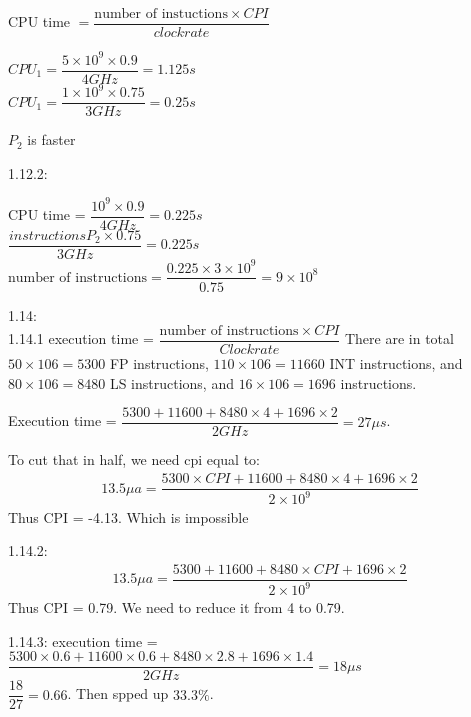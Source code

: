 \documentclass[12pt]{article}
\begin{document}
	CPU time $= \dfrac{\text{number of instuctions} \times CPI}{clock rate}$
	
	$CPU_1 = \dfrac{5 \times 10^9 \times 0.9}{4 GHz}= 1.125s$\\
	$CPU_1 = \dfrac{1 \times 10^9 \times 0.75}{3 GHz}= 0.25s$
	
	$P_2$ is faster
	
	1.12.2:
	
	CPU time = $\dfrac{10^9 \times 0.9}{4GHz} = 0.225s$\\
	$\dfrac{instructionsP_2 \times 0.75}{3 GHz} = 0.225s$\\
	$\text{number of instructions}=\dfrac{0.225 \times 3 \times 10^9}{0.75}=9 \times 10^8$
	
	1.14:\\
	1.14.1
	execution time  = $\dfrac{\text{number of instructions} \times CPI}{Clock rate}$
	There are in total $50 \times 106 = 5300$ FP instructions, $110 \times 106 = 11660$ INT instructions, and $80 \times 106 = 8480$ LS instructions, and $16 \times 106 = 1696$ instructions.
	
	Execution time = $\dfrac{5300 + 11600 + 8480 \times 4 + 1696 \times 2}{2GHz} = 27 \mu s$.
	
	To cut that in half, we need cpi equal to:
	\begin{align*}
		13.5 \mu a = \dfrac{5300 \times CPI + 11600 + 8480 \times 4 + 1696 \times 2}{2 \times 10^9}
	\end{align*}
	Thus CPI = -4.13.
	Which is impossible
	
	1.14.2:
	 \begin{align*}
	 	13.5 \mu a = \dfrac{5300 + 11600 + 8480 \times CPI + 1696 \times 2}{2 \times 10^9}
	 \end{align*}
 Thus CPI = 0.79. We need to reduce it from 4 to 0.79.
 
 	1.14.3:
execution time = $\dfrac{5300 \times 0.6 + 11600 \times 0.6 + 8480 \times 2.8 + 1696 \times 1.4}{2GHz} = 18 \mu s$\\
$\dfrac{18}{27} = 0.66$. Then spped up $33.3 \%$.
	
\end{document}
